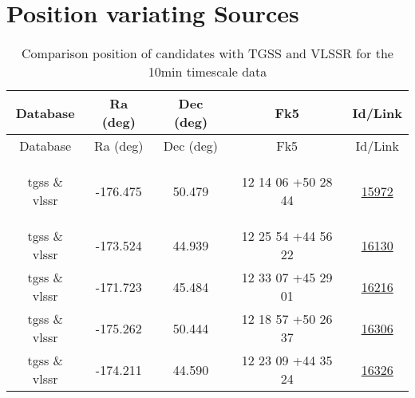 \documentclass{article}
\begin{document}
\section{Position variating Sources}\label{possection:KmeulenTrap4P23:10min}

\begin{longtable}{c|c|c|c|c} 
\toprule 
Database & Ra (deg) & Dec (deg)& Fk5 & Id/Link \\\midrule 
\endfirsthead 
\toprule 
Database & Ra (deg) & Dec (deg) & Fk5 &Id/Link  \\\midrule 
\endhead 
\bottomrule 
\endfoot 
\bottomrule
\caption{ Comparison position of candidates with TGSS and VLSSR for the 10min timescale data} 
\endlastfoot
\label{KmeulenTrap4P23:10min:tablepos}

tgss \& vlssr & -176.475 & 50.479 & 12 14 06 +50 28 44 &  \href{http://banana.transientskp.org/r4/vlo_KmeulenTrap4P23/runningcatalog/15972}{15972} \\
tgss \& vlssr & -173.524 & 44.939 & 12 25 54 +44 56 22 &  \href{http://banana.transientskp.org/r4/vlo_KmeulenTrap4P23/runningcatalog/16130}{16130} \\
tgss \& vlssr & -171.723 & 45.484 & 12 33 07 +45 29 01 &  \href{http://banana.transientskp.org/r4/vlo_KmeulenTrap4P23/runningcatalog/16216}{16216} \\
tgss \& vlssr & -175.262 & 50.444 & 12 18 57 +50 26 37 &  \href{http://banana.transientskp.org/r4/vlo_KmeulenTrap4P23/runningcatalog/16306}{16306} \\
tgss \& vlssr & -174.211 & 44.590 & 12 23 09 +44 35 24 &  \href{http://banana.transientskp.org/r4/vlo_KmeulenTrap4P23/runningcatalog/16326}{16326} \\
\end{longtable}
\end{document}

